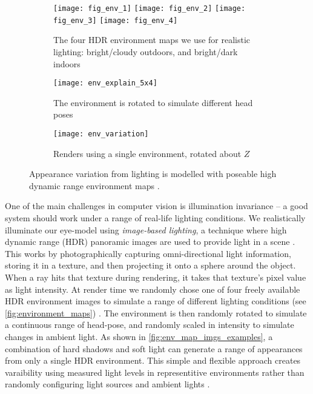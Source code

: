 \begin{figure}
    \begin{subfigure}[t]{\columnwidth}
        \texttt{[image: fig\_env\_1]} \hfill
    	\texttt{[image: fig\_env\_2]} \hfill
        \texttt{[image: fig\_env\_3]} \hfill
    	\texttt{[image: fig\_env\_4]}
	    \caption{The four HDR environment maps we use for realistic lighting: bright/cloudy outdoors, and bright/dark indoors}
    \end{subfigure}
    \par \medskip
    \begin{subfigure}[t]{0.48\columnwidth}
        \texttt{[image: env\_explain\_5x4]}
    	\caption{The environment is rotated to simulate different head poses}
    \end{subfigure}%
    \hfill
    \begin{subfigure}[t]{0.48\columnwidth}
        \texttt{[image: env\_variation]}
        \caption{Renders using a single environment, rotated about $Z$}
        \label{fig:env_map_imgs_examples}
    \end{subfigure}
    \caption{Appearance variation from lighting is modelled with poseable high dynamic range environment maps \cite{debevec2002image}.}
    \label{fig:environment_maps}
\end{figure}

One of the main challenges in computer vision is illumination invariance -- a good system should work under a range of real-life lighting conditions.
We realistically illuminate our eye-model using \emph{image-based lighting}, a technique where high dynamic range (HDR) panoramic images are used to provide light in a scene \cite{debevec2002image}.
This works by photographically capturing omni-directional light information, storing it in a texture, and then projecting it onto a sphere around the object.
When a ray hits that texture during rendering, it takes that texture's pixel value as light intensity.
At render time we randomly chose one of four freely available HDR environment images to simulate a range of different lighting conditions (see \autoref{fig:environment_maps}) \cite{AdaptiveSamplesHDR}.
The environment is then randomly rotated to simulate a continuous range of head-pose, and randomly scaled in intensity to simulate changes in ambient light.
As shown in \autoref{fig:env_map_imgs_examples}, a combination of hard shadows and soft light can generate a range of appearances from only a single HDR environment.
This simple and flexible approach creates varaibility using measured light levels in representitive environments rather than randomly configuring light sources and ambient lights \cite{zface}.

